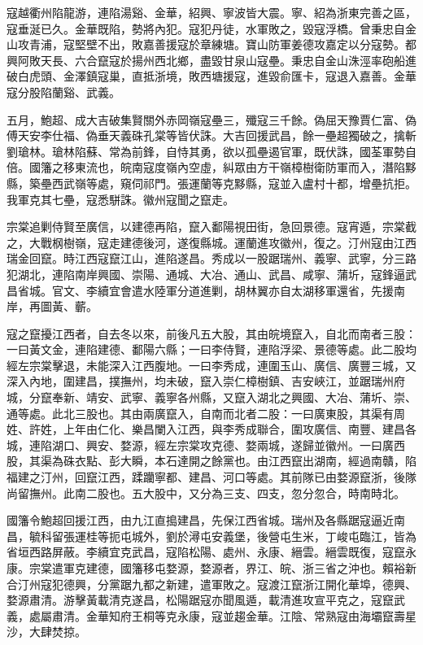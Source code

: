 \begin{pinyinscope}
寇越衢州陷龍游，連陷湯谿、金華，紹興、寧波皆大震。寧、紹為浙東完善之區，寇垂涎已久。金華既陷，勢將內犯。寇犯丹徒，水軍敗之，毀寇浮橋。曾秉忠自金山攻青浦，寇堅壁不出，敗嘉善援寇於章練塘。寶山防軍姜德攻嘉定以分寇勢。都興阿敗天長、六合竄寇於揚州西北鄉，盡毀甘泉山寇壘。秉忠自金山洙涇率砲船進破白虎頭、金澤鎮寇巢，直抵浙境，敗西塘援寇，進毀俞匯卡，寇退入嘉善。金華寇分股陷蘭谿、武義。

五月，鮑超、成大吉破集賢關外赤岡嶺寇壘三，殲寇三千餘。偽屈天豫賈仁富、偽傅天安李仕福、偽垂天義硃孔棠等皆伏誅。大吉回援武昌，餘一壘超獨破之，擒斬劉瑲林。瑲林陷蘇、常為前鋒，自恃其勇，欲以孤壘遏官軍，既伏誅，國荃軍勢自倍。國籓之移東流也，皖南寇度嶺內空虛，糾眾由方干嶺樟樹衛防軍而入，潛陷黟縣，築壘西武嶺等處，窺伺祁門。張運蘭等克黟縣，寇並入盧村十都，增壘抗拒。我軍克其七壘，寇悉駢誅。徽州寇聞之竄走。

宗棠追剿侍賢至廣信，以建德再陷，竄入鄱陽視田街，急回景德。寇宵遁，宗棠截之，大戰㭎樹嶺，寇走建德後河，遂復縣城。運蘭進攻徽州，復之。汀州寇由江西瑞金回竄。時江西寇竄江山，進陷遂昌。秀成以一股踞瑞州、義寧、武寧，分三路犯湖北，連陷南岸興國、崇陽、通城、大冶、通山、武昌、咸寧、蒲圻，寇鋒逼武昌省城。官文、李續宜會遣水陸軍分道進剿，胡林翼亦自太湖移軍還省，先援南岸，再圖黃、蘄。

寇之竄擾江西者，自去冬以來，前後凡五大股，其由皖境竄入，自北而南者三股：一曰黃文金，連陷建德、鄱陽六縣；一曰李侍賢，連陷浮梁、景德等處。此二股均經左宗棠擊退，未能深入江西腹地。一曰李秀成，連圍玉山、廣信、廣豐三城，又深入內地，圍建昌，撲撫州，均未破，竄入崇仁樟樹鎮、吉安峽江，並踞瑞州府城，分竄奉新、靖安、武寧、義寧各州縣，又竄入湖北之興國、大冶、蒲圻、崇、通等處。此北三股也。其由兩廣竄入，自南而北者二股：一曰廣東股，其渠有周姓、許姓，上年由仁化、樂昌闌入江西，與李秀成聯合，圍攻廣信、南豐、建昌各城，連陷湖口、興安、婺源，經左宗棠攻克德、婺兩城，遂歸並徽州。一曰廣西股，其渠為硃衣點、彭大瞬，本石達開之餘黨也。由江西竄出湖南，經過南贛，陷福建之汀州，回竄江西，蹂躪寧都、建昌、河口等處。其前隊已由婺源竄浙，後隊尚留撫州。此南二股也。五大股中，又分為三支、四支，忽分忽合，時南時北。

國籓令鮑超回援江西，由九江直搗建昌，先保江西省城。瑞州及各縣踞寇逼近南昌，毓科留張運桂等扼屯城外，劉於潯屯安義堡，後營屯生米，丁峻屯臨江，皆為省垣西路屏蔽。李續宜克武昌，寇陷松陽、處州、永康、縉雲。縉雲既復，寇竄永康。宗棠遣軍克建德，國籓移屯婺源，婺源者，界江、皖、浙三省之沖也。賴裕新合汀州寇犯德興，分黨踞九都之新建，遣軍敗之。寇渡江竄浙江開化華埠，德興、婺源肅清。游擊黃載清克遂昌，松陽踞寇亦聞風遁，載清進攻宣平克之，寇竄武義，處屬肅清。金華知府王桐等克永康，寇並趨金華。江陰、常熟寇由海壩竄壽星沙，大肆焚掠。


\end{pinyinscope}
